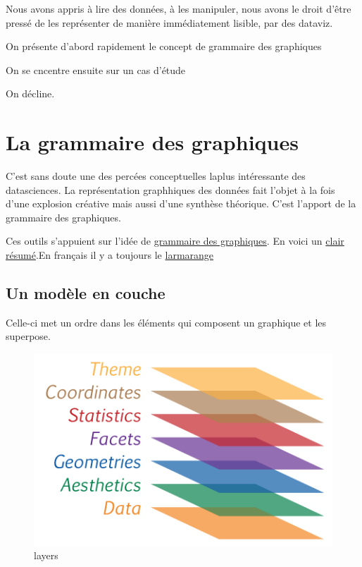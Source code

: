 \documentclass[
]{book}
\begin{document}
Nous avons appris à lire des données, à les manipuler, nous avons le droit d'être pressé de les représenter de manière immédiatement lisible, par des dataviz.

On présente d'abord rapidement le concept de grammaire des graphiques

On se cncentre ensuite sur un cas d'étude

On décline.

\hypertarget{la-grammaire-des-graphiques}{%
\section{La grammaire des graphiques}\label{la-grammaire-des-graphiques}}

C'est sans doute une des percées conceptuelles laplus intéressante des datasciences. La représentation graphhiques des données fait l'objet à la fois d'une explosion créative mais aussi d'une synthèse théorique. C'est l'apport de la grammaire des graphiques.

Ces outils s'appuient sur l'idée de \href{https://www.goodreads.com/book/show/2549408.The_Grammar_of_Graphics}{grammaire des graphiques}. En voici un \href{https://cfss.uchicago.edu/notes/grammar-of-graphics/}{clair résumé}.En français il y a toujours le \href{http://larmarange.github.io/analyse-R/intro-ggplot2.html}{larmarange}

\hypertarget{un-moduxe8le-en-couche}{%
\subsection{Un modèle en couche}\label{un-moduxe8le-en-couche}}

Celle-ci met un ordre dans les éléments qui composent un graphique et les superpose.

\begin{figure}
\centering
\includegraphics{./Images/graphiclayers.png}
\caption{layers}
\end{figure}
\end{document}
